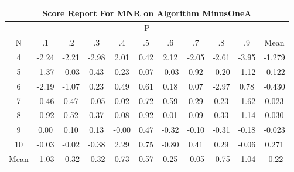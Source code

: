 \documentclass[11pt,a4paper]{report}
\begin{document}
\begin{longtable}{ | c || c | c | c | c | c | c | c | c | c || c |}
\hline
\multicolumn{11}{|c|}{ Score Report For MNR on Algorithm MinusOneA} \\
\hline
\multicolumn{11}{|c|}{ P } \\
\hline
N & .1 & .2 & .3 & .4 & .5 & .6 & .7 & .8 & .9 & Mean\\
 \hline
 \hline
 \endhead
  4 &  \cellcolor[HTML]{FFC7C7} -2.24 &  \cellcolor[HTML]{FFC7C7} -2.21 &  \cellcolor[HTML]{FFB7B7} -2.98 &  \cellcolor[HTML]{CFCFFF} 2.01 &  \cellcolor[HTML]{F7F7FF} 0.42 &  \cellcolor[HTML]{C7C7FF} 2.12 &  \cellcolor[HTML]{FFCFCF} -2.05 &  \cellcolor[HTML]{FFBFBF} -2.61 &  \cellcolor[HTML]{FF9F9F} -3.95 & -1.279 \\
  5 &  \cellcolor[HTML]{FFDFDF} -1.37 &  \cellcolor[HTML]{FFFFFF} -0.03 &  \cellcolor[HTML]{F7F7FF} 0.43 &  \cellcolor[HTML]{F7F7FF} 0.23 &  \cellcolor[HTML]{FFFFFF} 0.07 &  \cellcolor[HTML]{FFFFFF} -0.03 &  \cellcolor[HTML]{E7E7FF} 0.92 &  \cellcolor[HTML]{FFF7F7} -0.20 &  \cellcolor[HTML]{FFDFDF} -1.12 & -0.122 \\
  6 &  \cellcolor[HTML]{FFC7C7} -2.19 &  \cellcolor[HTML]{FFE7E7} -1.07 &  \cellcolor[HTML]{F7F7FF} 0.23 &  \cellcolor[HTML]{EFEFFF} 0.49 &  \cellcolor[HTML]{EFEFFF} 0.61 &  \cellcolor[HTML]{F7F7FF} 0.18 &  \cellcolor[HTML]{FFFFFF} 0.07 &  \cellcolor[HTML]{FFB7B7} -2.97 &  \cellcolor[HTML]{EFEFFF} 0.78 & -0.430 \\
  7 &  \cellcolor[HTML]{FFF7F7} -0.46 &  \cellcolor[HTML]{F7F7FF} 0.47 &  \cellcolor[HTML]{FFFFFF} -0.05 &  \cellcolor[HTML]{FFFFFF} 0.02 &  \cellcolor[HTML]{EFEFFF} 0.72 &  \cellcolor[HTML]{EFEFFF} 0.59 &  \cellcolor[HTML]{F7F7FF} 0.29 &  \cellcolor[HTML]{F7F7FF} 0.23 &  \cellcolor[HTML]{FFD7D7} -1.62 & 0.023 \\
  8 &  \cellcolor[HTML]{FFE7E7} -0.92 &  \cellcolor[HTML]{EFEFFF} 0.52 &  \cellcolor[HTML]{F7F7FF} 0.37 &  \cellcolor[HTML]{FFFFFF} 0.08 &  \cellcolor[HTML]{E7E7FF} 0.92 &  \cellcolor[HTML]{FFFFFF} 0.01 &  \cellcolor[HTML]{FFFFFF} 0.09 &  \cellcolor[HTML]{F7F7FF} 0.33 &  \cellcolor[HTML]{FFDFDF} -1.14 & 0.030 \\
  9 &  \cellcolor[HTML]{FFFFFF} 0.00 &  \cellcolor[HTML]{FFFFFF} 0.10 &  \cellcolor[HTML]{FFFFFF} 0.13 &  \cellcolor[HTML]{FFFFFF} -0.00 &  \cellcolor[HTML]{F7F7FF} 0.47 &  \cellcolor[HTML]{FFF7F7} -0.32 &  \cellcolor[HTML]{FFFFFF} -0.10 &  \cellcolor[HTML]{FFF7F7} -0.31 &  \cellcolor[HTML]{FFF7F7} -0.18 & -0.023 \\
  10 &  \cellcolor[HTML]{FFFFFF} -0.03 &  \cellcolor[HTML]{FFFFFF} -0.02 &  \cellcolor[HTML]{FFF7F7} -0.38 &  \cellcolor[HTML]{C7C7FF} 2.29 &  \cellcolor[HTML]{EFEFFF} 0.75 &  \cellcolor[HTML]{FFE7E7} -0.80 &  \cellcolor[HTML]{F7F7FF} 0.41 &  \cellcolor[HTML]{F7F7FF} 0.29 &  \cellcolor[HTML]{FFFFFF} -0.06 & 0.271 \\
 \hline
 \hline
Mean &  \cellcolor[HTML]{FFE7E7} -1.03 &  \cellcolor[HTML]{FFF7F7} -0.32 &  \cellcolor[HTML]{FFF7F7} -0.32 &  \cellcolor[HTML]{EFEFFF} 0.73 &  \cellcolor[HTML]{EFEFFF} 0.57 &  \cellcolor[HTML]{F7F7FF} 0.25 &  \cellcolor[HTML]{FFFFFF} -0.05 &  \cellcolor[HTML]{FFEFEF} -0.75 &  \cellcolor[HTML]{FFE7E7} -1.04 &  \cellcolor[HTML]{FFF7F7} -0.22
\end{longtable}
\end{document}
